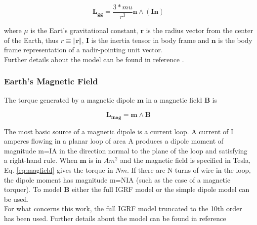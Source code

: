 \documentclass[11pt,a4paper]{report}
\begin{document}
\begin{equation}
 \mathbf{L_{gg}} = \frac{3*mu}{r^3} \mathbf{n} \wedge (\mathbf{I} \mathbf{n})
\end{equation}

where $\mu$ is the Eart's gravitational constant, $\textbf{r}$ is the radius vector from the center of the Earth, thus $r \equiv \Vert{\textbf{r}}\Vert$, $\textbf{I}$ is the inertia tensor in body frame and $\textbf{n}$ is the body frame representation of a nadir-pointing unit vector.\\
Further details about the model can be found in reference \cite{Ref:Books:Fundamentals}.

\subsubsection{Earth's Magnetic Field}
The torque generated by a magnetic dipole $\textbf{m}$ in a magnetic field $\textbf{B}$ is

\begin{equation}
 \mathbf{L_{mag}} = \mathbf{m} \wedge \mathbf{B}
 \label{eq:magfield}
\end{equation}

The most basic source of a magnetic dipole is a current loop. A current of I amperes flowing in a planar loop of area A produces a dipole moment of magnitude m=IA in the direction normal to the plane of the loop and satisfying a right-hand rule.
When $\textbf{m}$ is in $Am^2$ and the magnetic field is specified in Tesla, Eq. \ref{eq:magfield} gives the torque in $Nm$. If there are N turns of wire in the loop, the dipole moment has magnitude m=NIA (such as the case of a magnetic torquer).
To model $\textbf{B}$ either the full IGRF model or the simple dipole model can be used.\\
For what concerns this work, the full IGRF model truncated to the 10th order has been used. Further details about the model can be found in reference \cite{Ref:Articles:IGRF}
\end{document}
